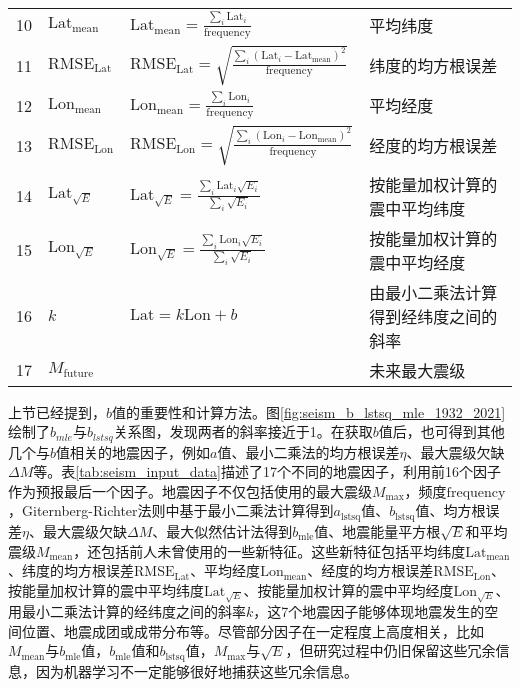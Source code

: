 \begin{sidewaystable}[htpb]
\begin{tabular}{llll}
    10 & $\mathrm{Lat}_{\mathrm{mean}}$ & $\displaystyle \mathrm{Lat}_{\mathrm{mean}}=\frac{\sum_i{\mathrm{Lat}_i}}{\mathrm{frequency}}$ & 平均纬度 \\ 
    11 & $\mathrm{RMSE}_{\mathrm{Lat}}$ & $\displaystyle \mathrm{RMSE}_{\mathrm{Lat}}=\sqrt{\frac{\sum_i{(\mathrm{Lat}_i-\mathrm{Lat}_\mathrm{mean})}^2}{\mathrm{frequency}}}$ & 纬度的均方根误差 \\ 
    12 & $\mathrm{Lon}_{\mathrm{mean}}$ & $\displaystyle \mathrm{Lon}_{\mathrm{mean}}=\frac{\sum_i{\mathrm{Lon}_i}}{\mathrm{frequency}}$ & 平均经度\\ 
    13 & $\mathrm{RMSE}_{\mathrm{Lon}}$ & $\displaystyle \mathrm{RMSE}_{\mathrm{Lon}}=\sqrt{\frac{\sum_i{(\mathrm{Lon}_i-\mathrm{Lon}_\mathrm{mean})}^2}{\mathrm{frequency}}}$ &  经度的均方根误差 \\ 
    14 & $\mathrm{Lat}_{\sqrt{E}}$ & $\displaystyle \mathrm{Lat}_{\sqrt{E}}=\frac{\sum_i{\mathrm{Lat}_i\sqrt{E_i}}}{\sum_i{\sqrt{E_i}}}$ & 按能量加权计算的震中平均纬度 \\ 
    15 & $\mathrm{Lon}_{\sqrt{E}}$ & $\displaystyle \mathrm{Lon}_{\sqrt{E}}=\frac{\sum_i{\mathrm{Lon}_i\sqrt{E_i}}}{\sum_i{\sqrt{E_i}}}$ & 按能量加权计算的震中平均经度 \\ 
    16 & $k$ & $\mathrm{Lat}=k\mathrm{Lon}+b$ & 由最小二乘法计算得到经纬度之间的斜率 \\
    17 & $M_{\mathrm{future}}$ & & 未来最大震级 \\
    \bottomrule
  \end{tabular} 
\end{sidewaystable}

上节已经提到，$b$值的重要性和计算方法。图\ref{fig:seism_b_lstsq_mle_1932_2021}绘制了$b_{mle}$与$b_{lstsq}$关系图，发现两者的斜率接近于1。在获取$b$值后，也可得到其他几个与$b$值相关的地震因子，例如$a$值、最小二乘法的均方根误差$\eta$、最大震级欠缺$\Delta M$等。表\ref{tab:seism_input_data}描述了17个不同的地震因子，利用前16个因子作为预报最后一个因子。地震因子不仅包括\citet{Panakkat2007Neural}使用的最大震级$M_{\max}$，频度$\mathrm{frequency}$，Giternberg-Richter法则中基于最小二乘法计算得到$a_{\mathrm{lstsq}}$值、$b_{\mathrm{lstsq}}$值、均方根误差$\eta$、最大震级欠缺$\Delta M$、最大似然估计法得到$b_{\mathrm{mle}}$值、地震能量平方根$\sqrt{E}$和平均震级$M_{\mathrm{mean}}$，还包括前人未曾使用的一些新特征。这些新特征包括平均纬度$\mathrm{Lat}_{\mathrm{mean}}$、纬度的均方根误差$\mathrm{RMSE}_{\mathrm{Lat}}$、平均经度$\mathrm{Lon}_{\mathrm{mean}}$、经度的均方根误差$\mathrm{RMSE}_{\mathrm{Lon}}$、按能量加权计算的震中平均纬度$\mathrm{Lat}_{\sqrt{E}}$、按能量加权计算的震中平均经度$\mathrm{Lon}_{\sqrt{E}}$、用最小二乘法计算的经纬度之间的斜率$k$，这7个地震因子能够体现地震发生的空间位置、地震成团或成带分布等。尽管部分因子在一定程度上高度相关，比如$M_{\mathrm{mean}}$与$b_{\mathrm{mle}}$值，$b_{\mathrm{mle}}$值和$b_{\mathrm{lstsq}}$值，$M_{\max}$与$\sqrt{E}$，但研究过程中仍旧保留这些冗余信息，因为机器学习不一定能够很好地捕获这些冗余信息。

